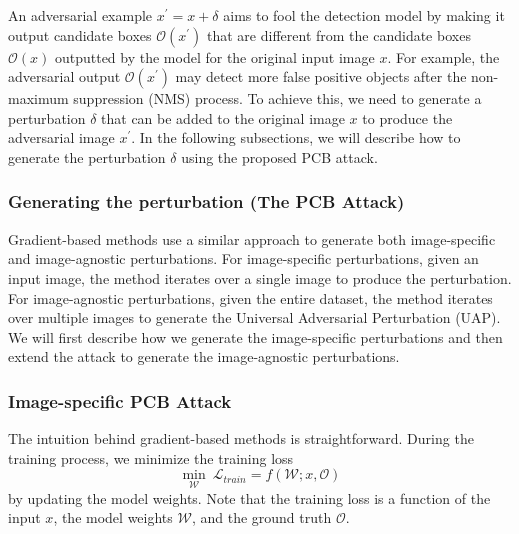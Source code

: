 An adversarial example $x^{'} = x + \delta$ aims to fool the detection model by making it output candidate boxes $\mathcal{O}(x^{'})$ that are different from the candidate boxes $\mathcal{O}(x)$ outputted by the model for the original input image $x$. For example, the adversarial output $\mathcal{O}(x^{'})$ may detect more false positive objects after the non-maximum suppression (NMS) process. To achieve this, we need to generate a perturbation $\delta$ that can be added to the original image $x$ to produce the adversarial image $x^{'}$. In the following subsections, we will describe how to generate the perturbation $\delta$ using the proposed PCB attack.

\subsubsection{Generating the perturbation (The PCB Attack)}


Gradient-based methods use a similar approach to generate both image-specific and image-agnostic perturbations. For image-specific perturbations, given an input image, the method iterates over a single image to produce the perturbation. 
For image-agnostic perturbations, given the entire dataset, the method iterates over multiple images to generate the Universal Adversarial Perturbation (UAP). We will first describe how we generate the image-specific perturbations and then extend the attack to generate the image-agnostic perturbations.

\subsubsection{\textbf{Image-specific PCB Attack}}

The intuition behind gradient-based methods is straightforward. During the training process, we minimize the training loss 
\begin{equation}
\min_{\mathcal{W}} \ \mathcal{L}_{train} = f(\mathcal{W}; x, \mathcal{O})
\end{equation}
by updating the model weights. Note that the training loss is a function of the input $x$, the model weights $\mathcal{W}$, and the ground truth $\mathcal{O}$. 

